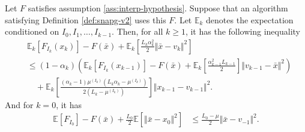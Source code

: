 \documentclass[12pt]{article}
\begin{document}
        \newpage
        \begin{theorem}\label{thm:snapg2-one-step}
            Let $F$ satisfies assumption \ref{ass:interp-hypothesis}. 
            Suppose that an algorithm satisfying Definition \ref{def:snapg-v2} uses this $F$. 
            Let $\mathbb E_k$ denotes the expectation conditioned on $I_0, I_1, \ldots, I_{k - 1}$. 
            Then, for all $k \ge 1$, it has the following inequality 
            \begin{align*}
                & \mathbb E_k\left[F_{I_k}(x_{k})\right] 
                - F(\bar x) 
                + \mathbb E_k\left[
                    \frac{L_k\alpha_k^2}{2}\Vert \bar x - v_k\Vert^2 
                \right]
                \\
                &\le 
                (1 - \alpha_k)\left(
                        \mathbb E_k \left[F_{I_k}(x_{k - 1})\right] 
                        - F(\bar x)
                        + \mathbb E_k \left[\frac{\alpha_{k - 1}^2L_{k - 1}}{2}\right]\Vert v_{k - 1} - \bar x\Vert^2
                \right)
                    \\ &\quad 
                    + \mathbb E_k\left[
                        \frac{(\alpha_k - 1)\mu^{(I_k)}\left(L_k\alpha_k - \mu^{(I_k)}\right)}{2\left(L_k - \mu^{(I_k)}\right)}
                    \right]\Vert x_{k - 1} - v_{k - 1} \Vert^2. 
            \end{align*}
            And for $k = 0$, it has 
            \begin{align*}
                \mathbb E \left[ F_{I_0}\right] - F(\bar x) 
                + \frac{L_0}{2}\mathbb E \left[\Vert \bar x - x_0\Vert^2\right]
                &\le \frac{L_0 - \mu}{2}\Vert \bar x - v_{-1}\Vert^2. 
            \end{align*}
        \end{theorem}
\end{document}
